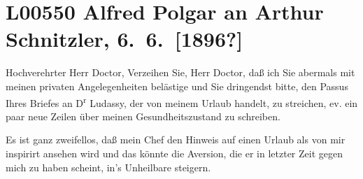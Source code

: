 

\section[Alfred Polgar an Arthur Schnitzler, 6. 6. {[}1896?{]}]{L00550 Alfred Polgar an Arthur Schnitzler, 6. 6. {[}1896?{]}}
\nopagebreak{}
\rehead{ }\normalsize\beginnumbering{}
\toendnotes[C]{\smallbreak\pagebreak[2]}
\toendnotes[C]{\smallbreak}
\pstart{}{\pb}Hochverehrter Herr Doctor,\pend\vspace{0.5em}
\pstart
           Verzeihen Sie, Herr Doctor, daß ich Sie abermals mit meinen privaten Angelegenheiten
               belästige und Sie dringendst bitte, den Passus Ihres Briefes an D\textsuperscript{r}{ }Ludassy, der von meinem Urlaub handelt, zu
               streichen, ev. ein paar neue Zeilen über meinen Gesundheitszustand zu schreiben.\pend
           
\pstart
           Es ist ganz zweifellos, daß mein Chef den Hinweis auf einen Urlaub als von mir
               inspirirt ansehen wird und das könnte die Aversion, die er in letzter Zeit gegen mich
               zu haben scheint, in’s Unheilbare steigern.\pend
           
